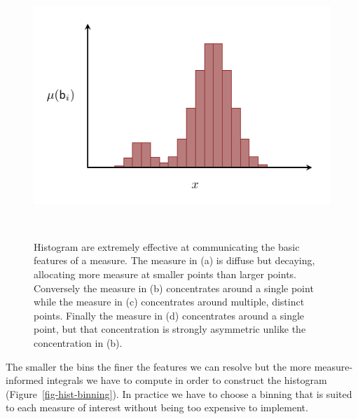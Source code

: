 \documentclass[
  letterpaper,
  DIV=11,
  numbers=noendperiod]{scrartcl}
\begin{document}
\begin{figure}
\begin{minipage}[t]{0.40\linewidth}
{{\includegraphics{figures/histograms/varying_behaviors/multimodal/multimodal.pdf}

}

}

\subcaption{\label{fig-hist-multimodal}}
\end{minipage}%
%
\begin{minipage}[t]{0.10\linewidth}

{\centering 

~

}

\end{minipage}%

\caption{\label{fig-hist-examples}Histogram are extremely effective at
communicating the basic features of a measure. The measure in (a) is
diffuse but decaying, allocating more measure at smaller points than
larger points. Conversely the measure in (b) concentrates around a
single point while the measure in (c) concentrates around multiple,
distinct points. Finally the measure in (d) concentrates around a single
point, but that concentration is strongly asymmetric unlike the
concentration in (b).}

\end{figure}

The smaller the bins the finer the features we can resolve but the more
measure-informed integrals we have to compute in order to construct the
histogram (Figure~\ref{fig-hist-binning}). In practice we have to choose
a binning that is suited to each measure of interest without being too
expensive to implement.
\end{document}
